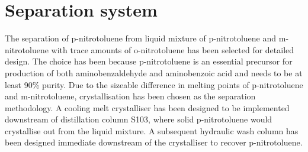 \section*{Separation system}

The separation of p-nitrotoluene from liquid mixture of p-nitrotoluene and m-nitrotoluene with trace amounts of o-nitrotoluene has been selected for detailed design. The choice has been because p-nitrotoluene is an essential precursor for production of both aminobenzaldehyde and aminobenzoic acid and needs to be at least 90\% purity. Due to the sizeable difference in melting points of p-nitrotoluene and m-nitrotoluene, crystallisation has been chosen as the separation methodology. A cooling melt crystalliser has been designed to be implemented downstream of distillation column S103, where solid p-nitrotoluene would crystallise out from the liquid mixture. A subsequent hydraulic wash column has been designed immediate downstream of the crystalliser to recover p-nitrotoluene. 

